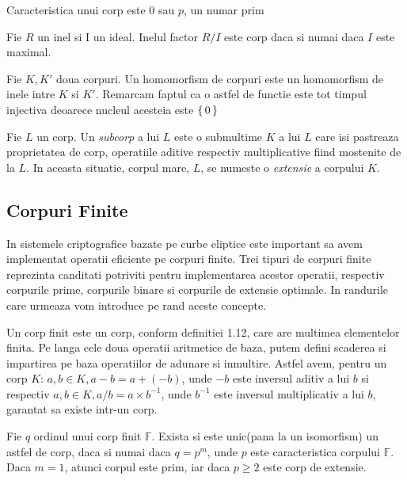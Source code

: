 \begin{prop}
Caracteristica unui corp este $0$ sau $p$, un numar prim
\end{prop}

\begin{prop}
Fie $R$ un inel si I un ideal. Inelul factor $R/I$ este corp daca si numai daca $I$ este maximal.
\end{prop}

\begin{dfn}
Fie $K, K'$ doua corpuri. Un homomorfism de corpuri este un homomorfism de inele intre $K$ si $K'$. Remarcam faptul ca o astfel de functie este tot timpul injectiva deoarece nucleul acesteia este $\set {0}$ 
\end{dfn}

\begin{dfn}
Fie $L$ un corp. Un \textit{subcorp} a lui $L$ este o submultime $K$ a lui $L$ care isi pastreaza proprietatea de corp, operatiile aditive respectiv multiplicative fiind mostenite de la $L$. In aceasta situatie, corpul mare, $L$, se numeste o \textit{extensie} a corpului $K$.
\end{dfn}
\subsection{Corpuri Finite}
\label{subsec:subsec01}

In sistemele criptografice bazate pe curbe eliptice este important sa avem implementat operatii eficiente pe corpuri finite. Trei tipuri de corpuri finite reprezinta canditati potriviti pentru implementarea acestor operatii, respectiv corpurile prime, corpurile binare si corpurile de extensie optimale. In randurile care urmeaza vom introduce pe rand aceste concepte.

\begin{dfn}
Un corp finit este un corp, conform definitiei 1.12, care are multimea elementelor finita. Pe langa cele doua operatii aritmetice de baza, putem defini scaderea si impartirea pe baza operatiilor de adunare si inmultire. Astfel avem, pentru un corp $K$: $a, b\in K, a-b = a + (-b)$, unde $-b$ este inversul aditiv a lui $b$ si respectiv $a, b\in K, a/b = a \times b^{-1}$, unde $b^{-1}$ este inversul multiplicativ a lui $b$, garantat sa existe intr-un corp. 
\end{dfn}

\begin{teo}
Fie $q$ ordinul unui corp finit $\mathbb{F}$. Exista si este unic(pana la un isomorfism) un astfel de corp, daca si numai daca $q=p^{m}$, unde $p$ este caracteristica corpului $\mathbb{F}$. Daca $m=1$, atunci corpul este prim, iar daca $p\geq 2$ este corp de extensie.
\end{teo}

